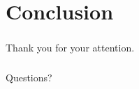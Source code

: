\documentclass[18pt]{beamer}
\begin{document}
\section{Conclusion}

\begin{frame}
  \frametitle{}
  \begin{center}
    \huge{Thank you for your attention.}
  \end{center}
\end{frame}

\begin{frame}
  \frametitle{}
  \begin{center}
    \huge{Questions?}
  \end{center}
\end{frame}
\end{document}
